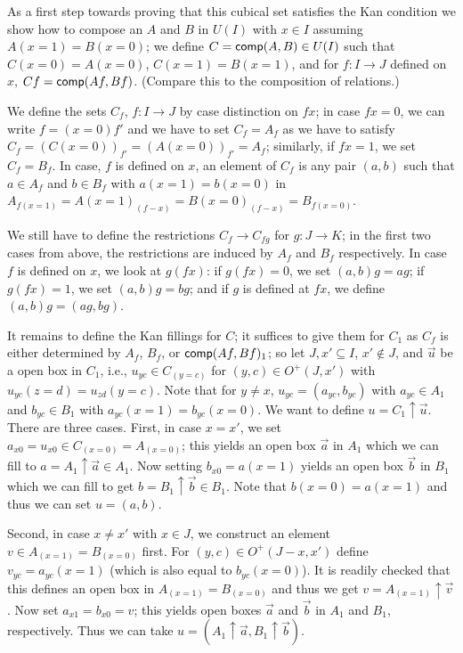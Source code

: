 \documentclass[10pt,a4paper]{article}
\newcommand{\comp}{{\sf comp}}
\newcommand{\rup}[1]{#1{\uparrow}}
\newcommand{\OO}{O}
\begin{document}
As a first step towards proving that this cubical set satisfies the
Kan condition we show how to compose an $A$ and $B$ in $U(I)$ with $x
\in I$ assuming $A (x=1) = B(x=0)$; we define $C = \comp(A,B) \in U
(I)$ such that $C (x=0) = A (x=0)$, $C(x=1) = B(x=1)$, and for $f
\colon I \to J$ defined on $x$, $C f = \comp (Af, Bf)$.  (Compare this
to the composition of relations.)

We define the sets $C_f$, $f \colon I \to J$ by case distinction on $f
x$; in case $f x = 0$, we can write $f = (x=0) f'$ and we have to set
$C_f = A_f$ as we have to satisfy $C_f = (C(x=0))_{f'} = (A
(x=0))_{f'} = A_f$; similarly, if $f x = 1$, we set $C_f = B_f$.  In
case, $f$ is defined on $x$, an element of $C_f$ is any pair $(a,b)$
such that $a \in A_f$ and $b \in B_f$ with $a (x=1) = b (x=0)$ in
$A_{f (x=1)} = {A(x=1)}_{(f - x)} = {B(x=0)}_{(f - x)} = B_{f (x=0)}$.

We still have to define the restrictions $C_f \to C_{fg}$ for $g
\colon J \to K$; in the first two cases from above, the restrictions
are induced by $A_f$ and $B_f$ respectively.  In case $f$ is defined
on $x$, we look at $g(f x)$: if $g (f x)= 0$, we set $(a,b) g = ag$; if
$g (f x) = 1$, we set $(a,b)g = bg$; and if $g$ is defined at $f x$, we
define $(a,b)g = (ag,bg)$.

It remains to define the Kan fillings for $C$; it suffices to give
them for $C_1$ as $C_f$ is either determined by $A_f$, $B_f$, or
$\comp (Af,Bf)_1$; so let $J, x' \subseteq I$, $x' \notin J$, and
$\vec u$ be a open box in $C_1$, i.e., $u_{yc} \in C_{(y=c)}$ for
$(y,c) \in \OO^+ (J,x')$ with $u_{yc} (z=d) = u_{zd} (y=c)$.  Note
that for $y \neq x$, $u_{yc}= (a_{yc}, b_{yc})$ with $a_{yc} \in A_1$
and $b_{yc} \in B_1$ with $a_{yc} (x=1) = b_{yc} (x=0)$.  We want to
define $u = \rup{C_1}\vec u$.  There are three cases.  First, in case
$x = x'$, we set $a_{x0} = u_{x0} \in C_{(x=0)} = A_{(x=0)}$; this
yields an open box $\vec a$ in $A_1$ which we can fill to $a =
\rup{A_1} \vec a \in A_1$.  Now setting $b_{x0} = a (x=1)$ yields an
open box $\vec b$ in $B_1$ which we can fill to get $b = \rup{B_1}
\vec b \in B_1$. Note that $b(x=0) = a (x=1)$ and thus we can set $u =
(a, b)$.

Second, in case $x \neq x'$ with $x \in J$, we construct an element $v
\in A_{(x=1)} = B_{(x=0)}$ first.  For $(y,c) \in \OO^+ (J-x, x')$
define $v_{yc} = a_{yc} (x=1)$ (which is also equal to $b_{yc}
(x=0)$).  It is readily checked that this defines an open box in
$A_{(x=1)} = B_{(x=0)}$ and thus we get $v = \rup{A_{(x=1)}} \vec v$.
Now set $a_{x1} = b_{x0} = v$; this yields open boxes $\vec a$ and
$\vec b$ in $A_1$ and $B_1$, respectively.  Thus we can take $u =
(\rup{A_1} \vec a,\rup{B_1} \vec b)$.
\end{document}
